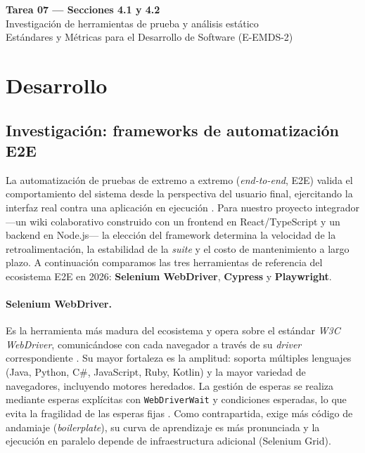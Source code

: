 \documentclass[12pt,a4paper]{article}
\begin{document}
\setcounter{section}{3}

\begin{center}
{\large\bfseries Tarea 07 --- Secciones 4.1 y 4.2}\\[2pt]
{\normalsize Investigación de herramientas de prueba y análisis estático}\\[2pt]
{\footnotesize Estándares y Métricas para el Desarrollo de Software (E-EMDS-2)}
\end{center}
\vspace{0.6em}

\section{Desarrollo}

\subsection{Investigación: frameworks de automatización E2E}
\label{sec:4-1}

La automatización de pruebas de extremo a extremo (\textit{end-to-end}, E2E) valida
el comportamiento del sistema desde la perspectiva del usuario final, ejercitando la
interfaz real contra una aplicación en ejecución \citep{jorgensen2022}. Para nuestro
proyecto integrador ---un wiki colaborativo construido con un frontend en
React/TypeScript y un backend en Node.js--- la elección del framework determina la
velocidad de la retroalimentación, la estabilidad de la \textit{suite} y el costo de
mantenimiento a largo plazo. A continuación comparamos las tres herramientas de
referencia del ecosistema E2E en 2026: \textbf{Selenium WebDriver}, \textbf{Cypress} y
\textbf{Playwright}.

\paragraph{Selenium WebDriver.}
Es la herramienta más madura del ecosistema y opera sobre el estándar
\textit{W3C WebDriver}, comunicándose con cada navegador a través de su \textit{driver}
correspondiente \citep{seleniumdocs}. Su mayor fortaleza es la amplitud: soporta
múltiples lenguajes (Java, Python, C\#, JavaScript, Ruby, Kotlin) y la mayor variedad de
navegadores, incluyendo motores heredados. La gestión de esperas se realiza mediante
esperas explícitas con \texttt{WebDriverWait} y condiciones esperadas, lo que evita la
fragilidad de las esperas fijas \citep{garcia2022}. Como contrapartida, exige más
código de andamiaje (\textit{boilerplate}), su curva de aprendizaje es más pronunciada y
la ejecución en paralelo depende de infraestructura adicional (Selenium Grid).
\end{document}
